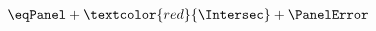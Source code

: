 \begin{multline} \label{eq:nExampleMultiline}
	\eqPanel + \textcolor{red}{\Intersec} + \PanelError
\end{multline}